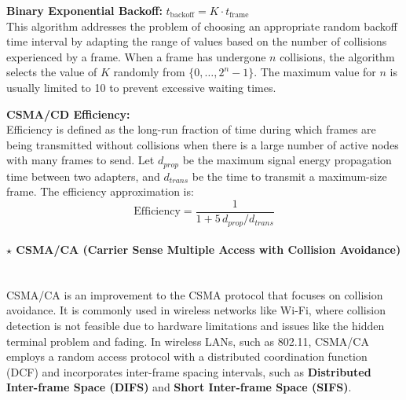 \noindent \textbf{Binary Exponential Backoff:} $\boxed{ t_\text{backoff} = K \cdot t_\text{frame} }$\\[2pt]
This algorithm addresses the problem of choosing an appropriate random backoff time interval by adapting the range of values based on the number of collisions experienced by a frame. When a frame has undergone $n$ collisions, the algorithm selects the value of $K$ randomly from $\{0, \dots, 2^{n} - 1\}$. The maximum value for $n$ is usually limited to 10 to prevent excessive waiting times.

\vspace{1em}
\noindent \textbf{CSMA/CD Efficiency:}\\[2pt]
Efficiency is defined as the long-run fraction of time during which frames are being transmitted without collisions when there is a large number of active nodes with many frames to send. Let $d_{prop}$ be the maximum signal energy propagation time between two adapters, and $d_{trans}$ be the time to transmit a maximum-size frame. The efficiency approximation is:
$$
    \text{Efficiency} = \frac{1}{1 + 5\, d_{prop}/d_{trans}}
$$

\paragraph[5.3.2.4 CSMA/CA (Carrier Sense Multiple Access with Collision Avoidance)]{$\pmb{\star}$ CSMA/CA (Carrier Sense Multiple Access with Collision Avoidance)}\mbox{}\\[4pt]
CSMA/CA is an improvement to the CSMA protocol that focuses on collision avoidance. It is commonly used in wireless networks like Wi-Fi, where collision detection is not feasible due to hardware limitations and issues like the hidden terminal problem and fading. In wireless LANs, such as 802.11, CSMA/CA employs a random access protocol with a distributed coordination function (DCF) and incorporates inter-frame spacing intervals, such as \textbf{Distributed Inter-frame Space (DIFS)} and \textbf{Short Inter-frame Space (SIFS)}.

